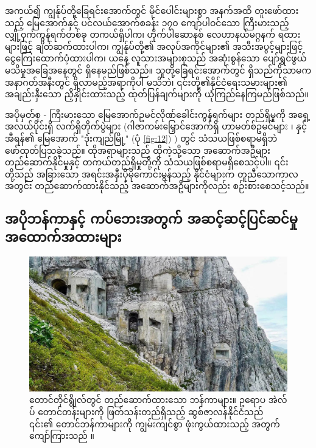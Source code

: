 \documentclass[10pt,twocolumn,letterpaper]{article}
\begin{document}
အကယ်၍ ကျွန်ုပ်တို့ခြေရင်းအောက်တွင် မိုင်ပေါင်းများစွာ အနက်အထိ တူးဖော်ထားသည့် မြေအောက်နှင့် ပင်လယ်အောက်စခန်း ၁၇၀ ကျော်ပါဝင်သော ကြီးမားသည့် လျှို့ဝှက်ကွန်ရက်တစ်ခု တကယ်ရှိပါက၊ ဟိုက်ပါဆောနစ် လေဟာနယ်မဂ္ဂနက် ရထားများဖြင့် ချိတ်ဆက်ထားပါက၊ ကျွန်ုပ်တို့၏ အလုပ်အကိုင်များ၏ အသီးအပွင့်များဖြင့် ငွေကြေးထောက်ပံ့ထားပါက၊ ယနေ့ လူသားအများစုသည် အဆုံးစွန်သော ပျော်ရွှင်ဖွယ် မသိမှုအခြေအနေတွင် ရှိနေမည်ဖြစ်သည်။ သူတို့ခြေရင်းအောက်တွင် ရှိသည်ကိုသာမက အနာဂတ်အနီးတွင် ရှိလာမည့်အရာကိုပါ မသိဘဲ၊ ၎င်းတို့၏နိုင်ငံရေးသမားများ၏ အချည်းနှီးသော ညှိနှိုင်းထားသည့် ထုတ်ပြန်ချက်များကို ယုံကြည်နေကြမည်ဖြစ်သည်။

အပိုမှတ်စု - ကြီးမားသော မြေအောက်ဥမင်လိုဏ်ခေါင်းကွန်ရက်များ တည်ရှိမှုကို အရှေ့အလယ်ပိုင်းရှိ လက်ရှိတိုက်ပွဲများ (ဂါဇာကမ်းမြှောင်အောက်ရှိ ဟာမတ်စ်ဥမင်များ \cite{38}၊ နှင့် အီရန်၏ မြေအောက် "ဒုံးကျည်မြို့" (ပုံ \ref{fig:12}) \cite{39,40}) တွင် သံသယဖြစ်စရာမရှိဘဲ ဖော်ထုတ်ပြသခဲ့သည်။ ထိုအရာများသည် ထိုကဲ့သို့သော အဆောက်အဦများ တည်ဆောက်နိုင်မှုနှင့် တကယ်တည်ရှိမှုတို့ကို သံသယဖြစ်စရာမရှိစေသင့်ပါ။ ၎င်းတို့သည် အခြားသော အရင်းအနှီးပိုမိုကောင်းမွန်သည့် နိုင်ငံများက တူညီသောကာလအတွင်း တည်ဆောက်ထားနိုင်သည့် အဆောက်အဦများကိုလည်း စဉ်းစားစေသင့်သည်။
\subsection{အပိုဘန်ကာနှင့် ကပ်ဘေးအတွက် အဆင့်ဆင့်ပြင်ဆင်မှု အထောက်အထားများ}

\begin{figure}[t]
\begin{center}
\includegraphics[width=1\linewidth]{tyrol.jpg}
\end{center}
   \caption{တောင်တိုင်ရွိုလ်တွင် တည်ဆောက်ထားသော ဘန်ကာများ။ ဥရောပ အဲလ်ပ် တောင်တန်းများကို ဖြတ်သန်းတည်ရှိသည့် ဆွစ်ဇာလန်နိုင်ငံသည် ၎င်း၏ တောင်ဘန်ကာများကို ကျွမ်းကျင်စွာ ဖုံးကွယ်ထားသည့် အတွက် ကျော်ကြားသည် \cite{32}။}
\label{fig:7}
\label{fig:onecol}
\end{figure}
\end{document}
